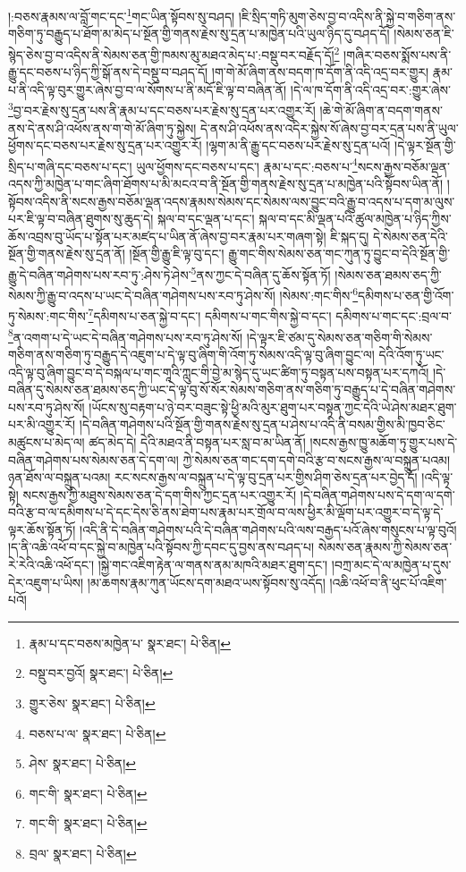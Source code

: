 །:བཅས་རྣམས་ལ་བློ་གང་དང་\footnote{རྣམ་པ་དང་བཅས་མཁྱེན་པ་  སྣར་ཐང་།  པེ་ཅིན། }གང་ཡིན་སྟོབས་སུ་བཤད། །ཇི་སྲིད་གཏི་མུག་ཅེས་བྱ་བ་འདིས་ནི་སྐྱེ་བ་གཅིག་ནས་གཅིག་ཏུ་བརྒྱུད་པ་ཐོག་མ་མེད་པ་སྔོན་གྱི་གནས་རྗེས་སུ་དྲན་པ་མཁྱེན་པའི་ཡུལ་ཉིད་དུ་བཤད་དོ། །སེམས་ཅན་ཇི་སྙེད་ཅེས་བྱ་བ་འདིས་ནི་སེམས་ཅན་གྱི་ཁམས་མུ་མཐའ་མེད་པ་:བསྡུ་བར་བརྗོད་དོ།\footnote{བསྡུ་བར་བྱའོ།  སྣར་ཐང་།  པེ་ཅིན། } །གཞིར་བཅས་སྨོས་པས་ནི་རྒྱུ་དང་བཅས་པ་ཉིད་ཀྱི་སྒོ་ནས་དེ་བསྡུ་བ་བཤད་དོ། །ག་གེ་མོ་ཞིག་ནས་བདག་ཁ་དོག་ནི་འདི་འདྲ་བར་གྱུར། རྣམ་པ་ནི་འདི་ལྟ་བུར་གྱུར་ཞེས་བྱ་བ་ལ་སོགས་པ་ནི་མདོ་ཇི་ལྟ་བ་བཞིན་ནོ། །དེ་ལ་ཁ་དོག་ནི་འདི་འདྲ་བར་:གྱུར་ཞེས་\footnote{གྱུར་ཅེས་  སྣར་ཐང་།  པེ་ཅིན། }བྱ་བར་རྗེས་སུ་དྲན་པས་ནི་རྣམ་པ་དང་བཅས་པར་རྗེས་སུ་དྲན་པར་འགྱུར་རོ། །ཆེ་གེ་མོ་ཞིག་ན་བདག་གནས་ནས་དེ་ནས་ཤི་འཕོས་ནས་ག་གེ་མོ་ཞིག་ཏུ་སྐྱེས། དེ་ནས་ཤི་འཕོས་ནས་འདིར་སྐྱེས་སོ་ཞེས་བྱ་བར་དྲན་པས་ནི་ཡུལ་ཕྱོགས་དང་བཅས་པར་རྗེས་སུ་དྲན་པར་འགྱུར་རོ། །ལྷག་མ་ནི་རྒྱུ་དང་བཅས་པར་རྗེས་སུ་དྲན་པའོ། །དེ་ལྟར་སྔོན་གྱི་སྲིད་པ་གཞི་དང་བཅས་པ་དང་། ཡུལ་ཕྱོགས་དང་བཅས་པ་དང་། རྣམ་པ་དང་:བཅས་པ་\footnote{བཅས་པ་ལ་  སྣར་ཐང་།  པེ་ཅིན། }སངས་རྒྱས་བཅོམ་ལྡན་འདས་ཀྱི་མཁྱེན་པ་གང་ཞིག་ཐོགས་པ་མི་མངའ་བ་ནི་སྔོན་གྱི་གནས་རྗེས་སུ་དྲན་པ་མཁྱེན་པའི་སྟོབས་ཡིན་ནོ། །སྟོབས་འདིས་ནི་སངས་རྒྱས་བཅོམ་ལྡན་འདས་རྣམས་སེམས་དང་སེམས་ལས་བྱུང་བའི་རྒྱུ་བ་འདས་པ་དག་མ་ལུས་པར་ཇི་ལྟ་བ་བཞིན་ཐུགས་སུ་ཆུད་དེ། སྐལ་བ་དང་ལྡན་པ་དང་། སྐལ་བ་དང་མི་ལྡན་པའི་ཚུལ་མཁྱེན་པ་ཉིད་ཀྱིས་ཆོས་འབྲས་བུ་ཡོད་པ་སྟོན་པར་མཛད་པ་ཡིན་ནོ་ཞེས་བྱ་བར་རྣམ་པར་གཞག་སྟེ། ཇི་སྐད་དུ། དེ་སེམས་ཅན་དེའི་སྔོན་གྱི་གནས་རྗེས་སུ་དྲན་ནོ། །སྔོན་གྱི་རྒྱུ་ཇི་ལྟ་བུ་དང་། རྒྱུ་གང་གིས་སེམས་ཅན་གང་ཀུན་ཏུ་བྱུང་བ་དེའི་སྔོན་གྱི་རྒྱུ་དེ་བཞིན་གཤེགས་པས་རབ་ཏུ་:ཤེས་ཏེ་ཤེས་\footnote{ཤེས་  སྣར་ཐང་།  པེ་ཅིན། }ནས་ཀྱང་དེ་བཞིན་དུ་ཆོས་སྟོན་ཏོ། །སེམས་ཅན་ཐམས་ཅད་ཀྱི་སེམས་ཀྱི་རྒྱུ་བ་འདས་པ་ཡང་དེ་བཞིན་གཤེགས་པས་རབ་ཏུ་ཤེས་སོ། །སེམས་:གང་གིས་\footnote{གང་གི་  སྣར་ཐང་།  པེ་ཅིན། }དམིགས་པ་ཅན་གྱི་འོག་ཏུ་སེམས་:གང་གིས་\footnote{གང་གི་  སྣར་ཐང་།  པེ་ཅིན། }དམིགས་པ་ཅན་སྐྱེ་བ་དང་། དམིགས་པ་གང་གིས་སྐྱེ་བ་དང་། དམིགས་པ་གང་དང་:བྲལ་བ་\footnote{བྲལ་  སྣར་ཐང་།  པེ་ཅིན། }ན་འགག་པ་དེ་ཡང་དེ་བཞིན་གཤེགས་པས་རབ་ཏུ་ཤེས་སོ། །དེ་ལྟར་ཇི་ཙམ་དུ་སེམས་ཅན་གཅིག་གི་སེམས་གཅིག་ནས་གཅིག་ཏུ་བརྒྱུད་དེ་འཇུག་པ་དེ་ལྟ་བུ་ཞིག་གི་འོག་ཏུ་སེམས་འདི་ལྟ་བུ་ཞིག་བྱུང་ལ། དེའི་འོག་ཏུ་ཡང་འདི་ལྟ་བུ་ཞིག་བྱུང་བ་དེ་བསྐལ་པ་གང་གཱའི་ཀླུང་གི་བྱེ་མ་སྙེད་དུ་ཡང་ཚིག་ཏུ་བསྟན་པས་བསྟན་པར་དཀའོ། །དེ་བཞིན་དུ་སེམས་ཅན་ཐམས་ཅད་ཀྱི་ཡང་དེ་ལྟ་བུ་སོ་སོར་སེམས་གཅིག་ནས་གཅིག་ཏུ་བརྒྱུད་པ་དེ་བཞིན་གཤེགས་པས་རབ་ཏུ་ཤེས་སོ། །ཡོངས་སུ་བརྟག་པ་ཉེ་བར་བཟུང་སྟེ་ཕྱི་མའི་མུར་ཐུག་པར་བསྟན་ཀྱང་དེའི་ཡེ་ཤེས་མཐར་ཐུག་པར་མི་འགྱུར་རོ། །དེ་བཞིན་གཤེགས་པའི་སྔོན་གྱི་གནས་རྗེས་སུ་དྲན་པ་ཤེས་པ་འདི་ནི་བསམ་གྱིས་མི་ཁྱབ་ཅིང་མཚུངས་པ་མེད་ལ། ཚད་མེད་དེ། དེའི་མཐའ་ནི་བསྟན་པར་སླ་བ་མ་ཡིན་ནོ། །སངས་རྒྱས་ཁྱུ་མཆོག་ཏུ་གྱུར་པས་དེ་བཞིན་གཤེགས་པས་སེམས་ཅན་དེ་དག་ལ། ཀྱེ་སེམས་ཅན་གང་དག་དགེ་བའི་རྩ་བ་སངས་རྒྱས་ལ་བསྐྲུན་པའམ། ཉན་ཐོས་ལ་བསྐྲུན་པའམ། རང་སངས་རྒྱས་ལ་བསྐྲུན་པ་དེ་ལྟ་བུ་དྲན་པར་གྱིས་ཤིག་ཅེས་དྲན་པར་བྱེད་དོ། །འདི་ལྟ་སྟེ། སངས་རྒྱས་ཀྱི་མཐུས་སེམས་ཅན་དེ་དག་གིས་ཀྱང་དྲན་པར་འགྱུར་རོ། །དེ་བཞིན་གཤེགས་པས་དེ་དག་ལ་དགེ་བའི་རྩ་བ་ལ་དམིགས་པ་དེ་དང་དེས་ཅི་ནས་ཐེག་པས་རྣམ་པར་གྲོལ་བ་ལས་ཕྱིར་མི་ལྡོག་པར་འགྱུར་བ་དེ་ལྟ་དེ་ལྟར་ཆོས་སྟོན་ཏོ། །འདི་ནི་དེ་བཞིན་གཤེགས་པའི་དེ་བཞིན་གཤེགས་པའི་ལས་བརྒྱད་པའོ་ཞེས་གསུངས་པ་ལྟ་བུའོ། །ད་ནི་འཆི་འཕོ་བ་དང་སྐྱེ་བ་མཁྱེན་པའི་སྟོབས་ཀྱི་དབང་དུ་བྱས་ནས་བཤད་པ། སེམས་ཅན་རྣམས་ཀྱི་སེམས་ཅན་རེ་རེའི་འཆི་འཕོ་དང་། །སྐྱེ་གང་འཇིག་རྟེན་ལ་གནས་ནམ་མཁའི་མཐར་ཐུག་དང་། །བཀྲ་མང་དེ་ལ་མཁྱེན་པ་དུས་དེར་འཇུག་པ་ཡིས། །མ་ཆགས་རྣམ་ཀུན་ཡོངས་དག་མཐའ་ཡས་སྟོབས་སུ་འདོད། །འཆི་འཕོ་བ་ནི་ཕུང་པོ་འཇིག་པའོ། 